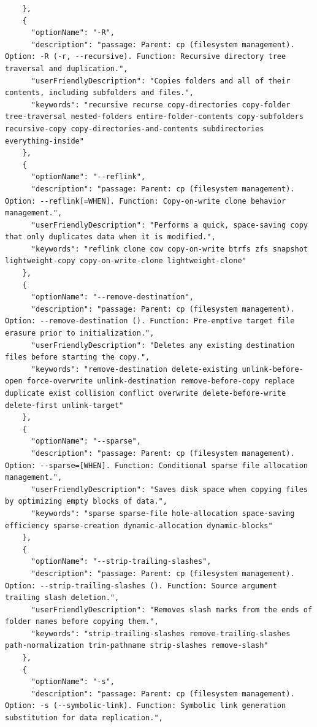 \begin{appendix}
\begin{lstlisting}
    },
    {
      "optionName": "-R",
      "description": "passage: Parent: cp (filesystem management). Option: -R (-r, --recursive). Function: Recursive directory tree traversal and duplication.",
      "userFriendlyDescription": "Copies folders and all of their contents, including subfolders and files.",
      "keywords": "recursive recurse copy-directories copy-folder tree-traversal nested-folders entire-folder-contents copy-subfolders recursive-copy copy-directories-and-contents subdirectories everything-inside"
    },
    {
      "optionName": "--reflink",
      "description": "passage: Parent: cp (filesystem management). Option: --reflink[=WHEN]. Function: Copy-on-write clone behavior management.",
      "userFriendlyDescription": "Performs a quick, space-saving copy that only duplicates data when it is modified.",
      "keywords": "reflink clone cow copy-on-write btrfs zfs snapshot lightweight-copy copy-on-write-clone lightweight-clone"
    },
    {
      "optionName": "--remove-destination",
      "description": "passage: Parent: cp (filesystem management). Option: --remove-destination (). Function: Pre-emptive target file erasure prior to initialization.",
      "userFriendlyDescription": "Deletes any existing destination files before starting the copy.",
      "keywords": "remove-destination delete-existing unlink-before-open force-overwrite unlink-destination remove-before-copy replace duplicate exist collision conflict overwrite delete-before-write delete-first unlink-target"
    },
    {
      "optionName": "--sparse",
      "description": "passage: Parent: cp (filesystem management). Option: --sparse=[WHEN]. Function: Conditional sparse file allocation management.",
      "userFriendlyDescription": "Saves disk space when copying files by optimizing empty blocks of data.",
      "keywords": "sparse sparse-file hole-allocation space-saving efficiency sparse-creation dynamic-allocation dynamic-blocks"
    },
    {
      "optionName": "--strip-trailing-slashes",
      "description": "passage: Parent: cp (filesystem management). Option: --strip-trailing-slashes (). Function: Source argument trailing slash deletion.",
      "userFriendlyDescription": "Removes slash marks from the ends of folder names before copying them.",
      "keywords": "strip-trailing-slashes remove-trailing-slashes path-normalization trim-pathname strip-slashes remove-slash"
    },
    {
      "optionName": "-s",
      "description": "passage: Parent: cp (filesystem management). Option: -s (--symbolic-link). Function: Symbolic link generation substitution for data replication.",

\end{lstlisting}
\end{appendix}
